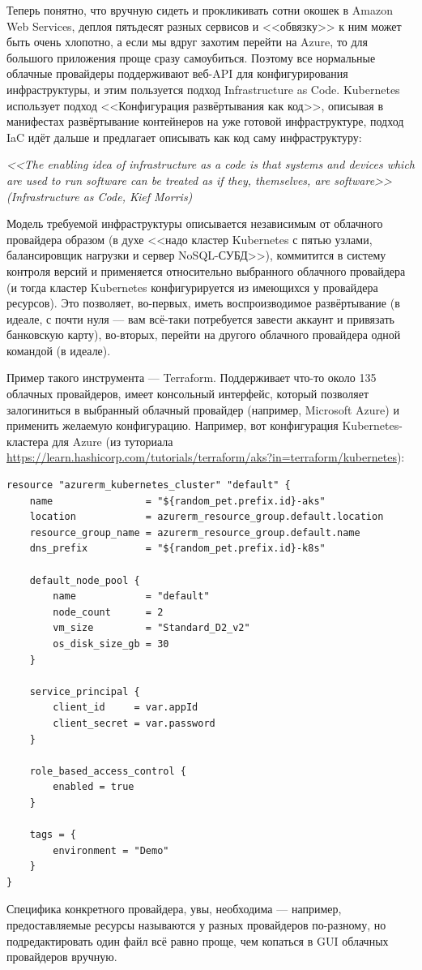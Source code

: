 \documentclass[a5paper]{article}
\begin{document}
Теперь понятно, что вручную сидеть и прокликивать сотни окошек в Amazon Web Services, деплоя пятьдесят разных сервисов и <<обвязку>> к ним может быть очень хлопотно, а если мы вдруг захотим перейти на Azure, то для большого приложения проще сразу самоубиться. Поэтому все нормальные облачные провайдеры поддерживают веб-API для конфигурирования инфраструктуры, и этим пользуется подход Infrastructure as Code. Kubernetes использует подход <<Конфигурация развёртывания как код>>, описывая в манифестах развёртывание контейнеров на уже готовой инфраструктуре, подход IaC идёт дальше и предлагает описывать как код саму инфраструктуру: 

\emph{<<The enabling idea of infrastructure as a code is that systems and devices which are used to run software can be treated as if they, themselves, are software>> (Infrastructure as Code, Kief Morris)}

Модель требуемой инфраструктуры описывается независимым от облачного провайдера образом (в духе <<надо кластер Kubernetes с пятью узлами, балансировщик нагрузки и сервер NoSQL-СУБД>>), коммитится в систему контроля версий и применяется относительно выбранного облачного провайдера (и тогда кластер Kubernetes конфигурируется из имеющихся у провайдера ресурсов). Это позволяет, во-первых, иметь воспроизводимое развёртывание (в идеале, с почти нуля --- вам всё-таки потребуется завести аккаунт и привязать банковскую карту), во-вторых, перейти на другого облачного провайдера одной командой (в идеале).

Пример такого инструмента --- Terraform. Поддерживает что-то около 135 облачных провайдеров, имеет консольный интерфейс, который позволяет залогиниться в выбранный облачный провайдер (например, Microsoft Azure) и применить желаемую конфигурацию. Например, вот конфигурация Kubernetes-кластера для Azure (из туториала \url{https://learn.hashicorp.com/tutorials/terraform/aks?in=terraform/kubernetes}):

\begin{verbatim}
resource "azurerm_kubernetes_cluster" "default" {
    name                = "${random_pet.prefix.id}-aks"
    location            = azurerm_resource_group.default.location
    resource_group_name = azurerm_resource_group.default.name
    dns_prefix          = "${random_pet.prefix.id}-k8s"
    
    default_node_pool {
        name            = "default"
        node_count      = 2
        vm_size         = "Standard_D2_v2"
        os_disk_size_gb = 30
    }
    
    service_principal {
        client_id     = var.appId
        client_secret = var.password
    }
    
    role_based_access_control {
        enabled = true
    }
    
    tags = {
        environment = "Demo"
    }
}
\end{verbatim}

Специфика конкретного провайдера, увы, необходима --- например, предоставляемые ресурсы называются у разных провайдеров по-разному, но подредактировать один файл всё равно проще, чем копаться в GUI облачных провайдеров вручную.
\end{document}

